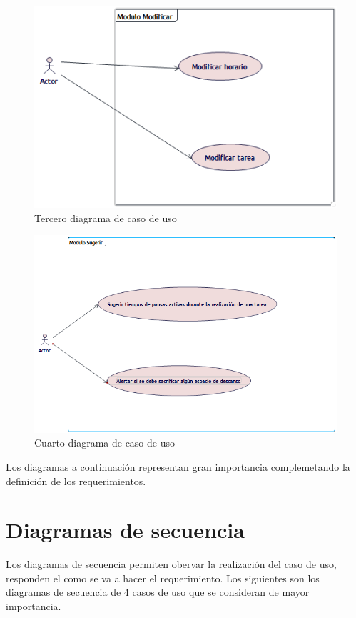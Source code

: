 \begin{figure}[H]
	\centering
	\includegraphics[width=0.7\linewidth]{diseno/requerimientos/imagenes/casouso3}
	\caption{Tercero diagrama de caso de uso}
	\label{fig:gantt}
\end{figure}
\begin{figure}[H]
	\centering
	\includegraphics[width=0.7\linewidth]{diseno/requerimientos/imagenes/casouso4}
	\caption{Cuarto diagrama de caso de uso}
	\label{fig:gantt}
\end{figure}

Los diagramas a continuación representan gran importancia complemetando la definición de los requerimientos.

\section{Diagramas de secuencia}
Los diagramas de secuencia permiten obervar la realización del caso de uso, responden el como se va a hacer el requerimiento. Los siguientes son los diagramas de secuencia de 4 casos de uso que se consideran de mayor importancia.

